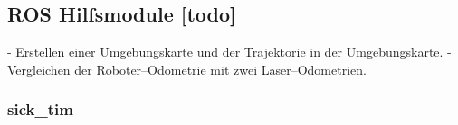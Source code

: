 \subsection{ROS Hilfsmodule [todo]}

- Erstellen einer Umgebungskarte und der Trajektorie in der Umgebungskarte.
- Vergleichen der Roboter--Odometrie mit zwei Laser--Odometrien.


\begin{comment}
--------------------------------------------------------------------------------
- \url{http://wiki.ros.org/sick_tim}
A ROS driver for the SICK TiM series of laser scanners.
Auslesen des 2D-LiDAR-Sensors und erstellen einer 
TIM571-2050101 (P/N 1075091); frequency: 15 Hz, angular resolution: 0.333°, range: 25m; see sick_tim571_2050101.launch

scan (sensor_msgs/LaserScan): The published laser scans.

~frame_id (str, default: laser): The TF frame in which laser scans will be returned.
\end{comment}
\subsubsection{sick\_tim}



\begin{comment}
--------------------------------------------------------------------------------
<node pkg="hector_mapping" type="hector_mapping" name="hector_mapping" output="screen">
  <param name="scan_topic" value="scan" />
  <param name="base_frame" value="base_link" />
  <param name="odom_frame" value="odom" />
  <param name="map_frame" value="map" />

  <param name="pub_map_odom_transform" value="true" />

  <param name="map_resolution" value="0.02" />
  <param name="laser_min_dist" value="0.05" />
	<param name="laser_max_dist" value="30.0" />
</node>
- \url{http://wiki.ros.org/hector_mapping}
- hector_mapping is a SLAM approach that can be used without odometry as well as on platforms that exhibit roll/pitch motion (of the sensor, the platform or both). It leverages the high update rate of modern LIDAR systems like the Hokuyo UTM-30LX and provides 2D pose estimates at scan rate of the sensors (40Hz for the UTM-30LX). While the system does not provide explicit loop closing ability, it is sufficiently accurate for many real world scenarios. The system has successfully been used on Unmanned Ground Robots, Unmanned Surface Vehicles, Handheld Mapping Devices and logged data from quadrotor UAVs.
- Bild vom OccupanyGrid
\end{comment}
